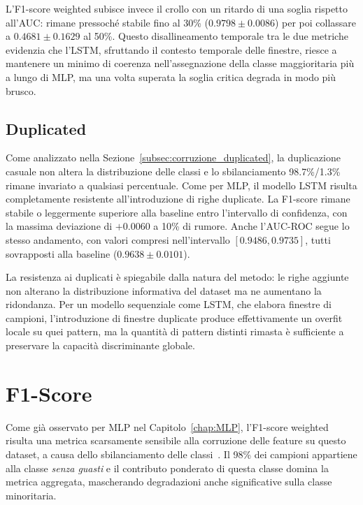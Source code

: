\documentclass[../main.tex]{subfiles}
\begin{document}
L'F1-score weighted subisce invece il crollo con un ritardo di una soglia rispetto all'AUC: rimane pressoché stabile fino al 30\% ($0.9798 \pm 0.0086$) per poi collassare a $0.4681 \pm 0.1629$ al 50\%. Questo disallineamento temporale tra le due metriche evidenzia che l'LSTM, sfruttando il contesto temporale delle finestre, riesce a mantenere un minimo di coerenza nell'assegnazione della classe maggioritaria più a lungo di MLP, ma una volta superata la soglia critica degrada in modo più brusco.

\subsection{Duplicated}
Come analizzato nella Sezione~\ref{subsec:corruzione_duplicated}, la duplicazione casuale non altera la distribuzione delle classi e lo sbilanciamento 98.7\%/1.3\% rimane invariato a qualsiasi percentuale. Come per MLP, il modello LSTM risulta completamente resistente all'introduzione di righe duplicate. La F1-score rimane stabile o leggermente superiore alla baseline entro l'intervallo di confidenza, con la massima deviazione di $+0.0060$ a 10\% di rumore. Anche l'AUC-ROC segue lo stesso andamento, con valori compresi nell'intervallo $[0.9486, 0.9735]$, tutti sovrapposti alla baseline ($0.9638 \pm 0.0101$).

La resistenza ai duplicati è spiegabile dalla natura del metodo: le righe aggiunte non alterano la distribuzione informativa del dataset ma ne aumentano la ridondanza. Per un modello sequenziale come LSTM, che elabora finestre di campioni, l'introduzione di finestre duplicate produce effettivamente un overfit locale su quei pattern, ma la quantità di pattern distinti rimasta è sufficiente a preservare la capacità discriminante globale.

\section{F1-Score}

Come già osservato per MLP nel Capitolo~\ref{chap:MLP}, l'F1-score weighted risulta una metrica scarsamente sensibile alla corruzione delle feature su questo dataset, a causa dello sbilanciamento delle classi~\cite{buda2018systematic, johnson2019survey}. Il 98\% dei campioni appartiene alla classe \textit{senza guasti} e il contributo ponderato di questa classe domina la metrica aggregata, mascherando degradazioni anche significative sulla classe minoritaria.
\end{document}
